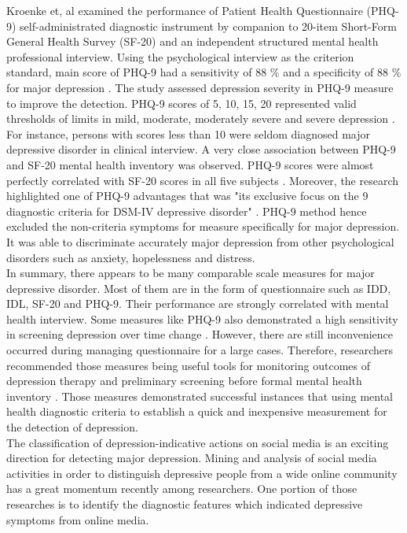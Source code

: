 \documentclass[12pt]{article}
\begin{document}
Kroenke et, al \cite{Kroenke} examined the performance of Patient Health Questionnaire (PHQ-9) self-administrated diagnostic instrument by companion to 20-item Short-Form General Health Survey (SF-20) and an independent structured mental health professional interview. Using the psychological interview as the criterion standard, main score of PHQ-9 had a sensitivity of 88 \% and a specificity of 88 \% for major depression \cite{Kroenke}. The study assessed depression severity in PHQ-9 measure to improve the detection.  PHQ-9 scores of 5, 10, 15, 20 represented valid thresholds of limits in mild, moderate, moderately severe and severe depression \cite{Kroenke}. For instance, persons with scores less than 10 were seldom diagnosed major depressive disorder in clinical interview. A very close association between PHQ-9 and SF-20 mental health inventory was observed. PHQ-9 scores were almost perfectly correlated with SF-20 scores in all five subjects \cite{Kroenke}. Moreover, the research highlighted one of PHQ-9 advantages that was "its exclusive focus on the 9 diagnostic criteria for DSM-IV depressive disorder" \cite{Kroenke}. PHQ-9 method hence excluded the non-criteria symptoms for measure specifically for major depression. It was able to discriminate accurately major depression from other psychological disorders such as anxiety, hopelessness and distress.
\\

In summary, there appears to be many comparable scale measures for major depressive disorder. Most of them are in the form of questionnaire such as IDD, IDL, SF-20 and PHQ-9. Their performance are strongly correlated with mental health interview. Some measures like PHQ-9 also demonstrated a high sensitivity in screening depression over time change \cite{Kroenke}. However, there are still inconvenience occurred during managing questionnaire for a large cases. Therefore, researchers recommended those measures being useful tools for monitoring outcomes of depression therapy \cite{Kroenke} and preliminary screening before formal mental health inventory \cite{Sakado}. Those measures demonstrated successful instances that using mental health diagnostic criteria to establish a quick and inexpensive measurement for the detection of depression.
\\

The classification of depression-indicative actions on social media is an exciting direction for detecting major depression. Mining and analysis of social media activities in order to distinguish depressive people from a wide online community has a great momentum recently among researchers. One portion of those researches is to identify the diagnostic features which indicated depressive symptoms from online media.\\
\end{document}
